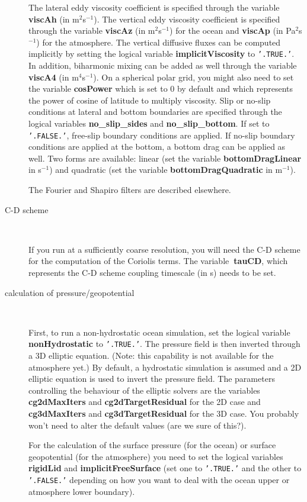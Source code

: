 \begin{description}
  The lateral eddy viscosity coefficient is specified through the
  variable \textbf{viscAh} (in m$^{2}$s$^{-1}$). The vertical eddy
  viscosity coefficient is specified through the variable
  \textbf{viscAz} (in m$^{2}$s$^{-1}$) for the ocean and
  \textbf{viscAp} (in Pa$^{2}$s$^{-1}$) for the atmosphere.  The
  vertical diffusive fluxes can be computed implicitly by setting the
  logical variable \textbf{implicitViscosity }to \texttt{'.TRUE.'}.
  In addition, biharmonic mixing can be added as well through the
  variable \textbf{viscA4} (in m$^{4}$s$^{-1}$). On a spherical polar
  grid, you might also need to set the variable \textbf{cosPower}
  which is set to 0 by default and which represents the power of
  cosine of latitude to multiply viscosity. Slip or no-slip conditions
  at lateral and bottom boundaries are specified through the logical
  variables \textbf{no\_slip\_sides} and \textbf{no\_slip\_bottom}. If
  set to \texttt{'.FALSE.'}, free-slip boundary conditions are
  applied. If no-slip boundary conditions are applied at the bottom, a
  bottom drag can be applied as well. Two forms are available: linear
  (set the variable \textbf{bottomDragLinear} in s$ ^{-1}$) and
  quadratic (set the variable \textbf{bottomDragQuadratic} in
  m$^{-1}$).

  The Fourier and Shapiro filters are described elsewhere.

\item[C-D scheme] \ 
  
  If you run at a sufficiently coarse resolution, you will need the
  C-D scheme for the computation of the Coriolis terms. The
  variable\textbf{\ tauCD}, which represents the C-D scheme coupling
  timescale (in s) needs to be set.
  
\item[calculation of pressure/geopotential] \ 
  
  First, to run a non-hydrostatic ocean simulation, set the logical
  variable \textbf{nonHydrostatic} to \texttt{'.TRUE.'}. The pressure
  field is then inverted through a 3D elliptic equation. (Note: this
  capability is not available for the atmosphere yet.) By default, a
  hydrostatic simulation is assumed and a 2D elliptic equation is used
  to invert the pressure field. The parameters controlling the
  behaviour of the elliptic solvers are the variables
  \textbf{cg2dMaxIters} and \textbf{cg2dTargetResidual } for
  the 2D case and \textbf{cg3dMaxIters} and
  \textbf{cg3dTargetResidual} for the 3D case. You probably won't need to
  alter the default values (are we sure of this?).
  
  For the calculation of the surface pressure (for the ocean) or
  surface geopotential (for the atmosphere) you need to set the
  logical variables \textbf{rigidLid} and \textbf{implicitFreeSurface}
  (set one to \texttt{'.TRUE.'} and the other to \texttt{'.FALSE.'}
  depending on how you want to deal with the ocean upper or atmosphere
  lower boundary).

\end{description} 

